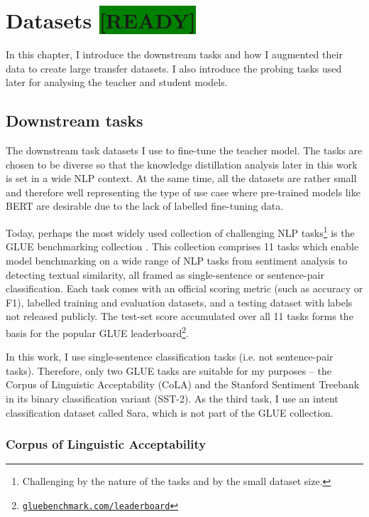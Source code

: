 \documentclass[bsc,frontabs,twoside,singlespacing,parskip,deptreport]{infthesis}
\def\reviewready{\colorbox{green}{[READY]}}
\newcommand\rurl[1]{%
  \href{https://#1}{\nolinkurl{#1}}%
}
\begin{document}
\chapter{Datasets \reviewready}{
  \label{chap:datasets}

  In this chapter, I introduce the downstream tasks and how I augmented their data to create large transfer datasets. I also introduce the probing tasks used later for analysing the teacher and student models.

  \section{Downstream tasks}{
    The downstream task datasets I use to fine-tune the teacher model. The tasks are chosen to be diverse so that the knowledge distillation analysis later in this work is set in a wide NLP context. At the same time, all the datasets are rather small and therefore well representing the type of use case where pre-trained models like BERT are desirable due to the lack of labelled fine-tuning data.

    Today, perhaps the most widely used collection of challenging NLP tasks\footnote{Challenging by the nature of the tasks and by the small dataset size.} is the GLUE benchmarking collection \citep{Wang_2018}. 
    This collection comprises 11 tasks which enable model benchmarking on a wide range of NLP tasks from sentiment analysis to detecting textual similarity, all framed as single-sentence or sentence-pair classification.
    Each task comes with an official scoring metric (such as accuracy or F1), labelled training and evaluation datasets, and a testing dataset with labels not released publicly.
    The test-set score accumulated over all 11 tasks forms the basis for the popular GLUE leaderboard\footnote{\rurl{gluebenchmark.com/leaderboard}}.
    
    In this work, I use single-sentence classification tasks (i.e. not sentence-pair tasks). Therefore, only two GLUE tasks are suitable for my purposes -- the Corpus of Linguistic Acceptability (CoLA) and the Stanford Sentiment Treebank in its binary classification variant (SST-2). As the third task, I use an intent classification dataset called Sara, which is not part of the GLUE collection.

    \subsection{Corpus of Linguistic Acceptability}{
      \label{sec:datasets-CoLA}

}}}
\end{document}
